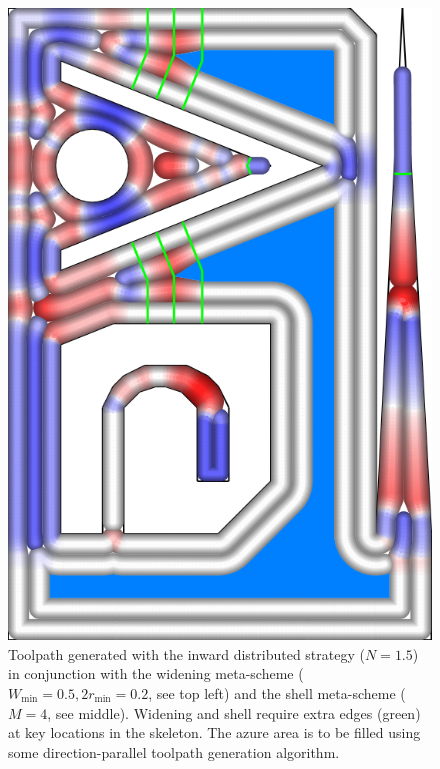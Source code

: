 {\begin{figure}
\centering
\includegraphics[rotate=90,width=.6\columnwidth]{sources-validation-gMat_example_all_combined.png}
\caption{
Toolpath generated with the inward distributed strategy ($N=1.5$) in conjunction with the widening meta-scheme ($W_\text{min}=0.5, 2r_\text{min}=0.2$, see top left) and the shell meta-scheme ($M=4$, see middle).
Widening and shell require extra edges (green) at key locations in the skeleton.
The azure area is to be filled using some direction-parallel toolpath generation algorithm.
}
\label{widening_shell}
\end{figure}
}
















